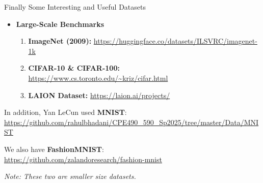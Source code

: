 \documentclass[aspectratio=169,xcolor=dvipsnames,svgnames,x11names,fleqn]{beamer}
\begin{document}
\begin{frame}[fragile]{Finally Some Interesting and Useful Datasets}
    
    \begin{itemize}
        \item \textcolor{largeData}{\textbf{Large-Scale Benchmarks}}
        \begin{enumerate}
            \item \textbf{ImageNet (2009):} {\scriptsize \url{https://huggingface.co/datasets/ILSVRC/imagenet-1k}}
            \item \textbf{CIFAR-10 \& CIFAR-100:} {\scriptsize \url{https://www.cs.toronto.edu/~kriz/cifar.html}}
            \item \textbf{LAION Dataset:} {\scriptsize \url{https://laion.ai/projects/}} 
        \end{enumerate}
    \end{itemize}

    \begin{tcolorbox}[colback=mnistPurple!5, colframe=mnistPurple!80, arc=2mm]
        \small
        In addition, Yan LeCun used \textbf{MNIST}: \\ 
        {\scriptsize \url{https://github.com/rahulbhadani/CPE490_590_Sp2025/tree/master/Data/MNIST}}
        
        \vspace{5pt}
        We also have \textbf{FashionMNIST}: \\
        {\scriptsize \url{https://github.com/zalandoresearch/fashion-mnist}}
        
        \vspace{5pt}
        \textit{\textcolor{mnistPurple!80!black}{Note: These two are smaller size datasets.}}
    \end{tcolorbox}


\end{frame}
\end{document}
